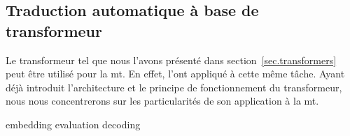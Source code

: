 \subsection{Traduction automatique à base de transformeur}
\label{subsec.nmt-transformer}

Le transformeur tel que nous l'avons présenté dans section~\ref{sec.transformers}
peut être utilisé pour la \gls{mt}.
En effet, \cite{attention} l'ont appliqué à cette même tâche.
Ayant déjà introduit l'architecture et le principe de fonctionnement du transformeur,
nous nous concentrerons sur les particularités de son application à la \gls{mt}.

{embedding}
{evaluation}
{decoding}